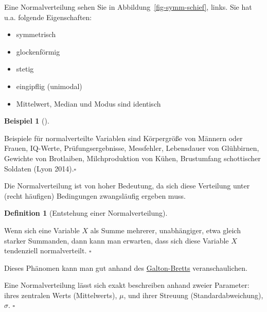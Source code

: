 \documentclass[
  a4paper,
  DIV=11]{scrreprt}
\providecommand{\tightlist}{%
  \setlength{\itemsep}{0pt}\setlength{\parskip}{0pt}}\usepackage{longtable,booktabs,array}
\theoremstyle{definition}
\theoremstyle{definition}
\newtheorem{example}{Beispiel}[chapter]
\theoremstyle{definition}
\newtheorem{definition}{Definition}[chapter]
\theoremstyle{remark}
\begin{document}
Eine Normalverteilung sehen Sie in Abbildung~\ref{fig-symm-schief},
links. Sie hat u.a. folgende Eigenschaften:

\begin{itemize}
\tightlist
\item
  symmetrisch
\item
  glockenförmig
\item
  stetig
\item
  eingipflig (unimodal)
\item
  Mittelwert, Median und Modus sind identisch
\end{itemize}

\begin{example}[]\protect\hypertarget{exm-norm}{}\label{exm-norm}

Beispiele für normalverteilte Variablen sind Körpergröße von Männern
oder Frauen, IQ-Werte, Prüfungsergebnisse, Messfehler, Lebensdauer von
Glühbirnen, Gewichte von Brotlaiben, Milchproduktion von Kühen,
Brustumfang schottischer Soldaten (Lyon 2014).\(\square\)

\end{example}

Die Normalverteilung ist von hoher Bedeutung, da sich diese Verteilung
unter (recht häufigen) Bedingungen zwangsläufig ergeben muss.

\begin{definition}[Entstehung einer
Normalverteilung]\protect\hypertarget{def-normal}{}\label{def-normal}

Wenn sich eine Variable \(X\) als Summe mehrerer, unabhängiger, etwa
gleich starker Summanden, dann kann man erwarten, dass sich diese
Variable \(X\) tendenziell normalverteilt. \(\square\)

\end{definition}

Dieses Phänomen kann man gut anhand des
\href{https://www.youtube.com/watch?v=3m4bxse2JEQ}{Galton-Bretts}
veranschaulichen.

\begin{tcolorbox}[enhanced jigsaw, leftrule=.75mm, opacitybacktitle=0.6, colback=white, colframe=quarto-callout-important-color-frame, coltitle=black, colbacktitle=quarto-callout-important-color!10!white, opacityback=0, left=2mm, breakable, titlerule=0mm, toptitle=1mm, bottomtitle=1mm, rightrule=.15mm, title=\textcolor{quarto-callout-important-color}{\faExclamation}\hspace{0.5em}{Parameter der Normalverteilung}, arc=.35mm, bottomrule=.15mm, toprule=.15mm]

Eine Normalverteilung lässt sich exakt beschreiben anhand zweier
Parameter: ihres zentralen Werts (Mittelwerts), \(\mu\), und ihrer
Streuung (Standardabweichung), \(\sigma\). \(\square\)

\end{tcolorbox}
\end{document}
